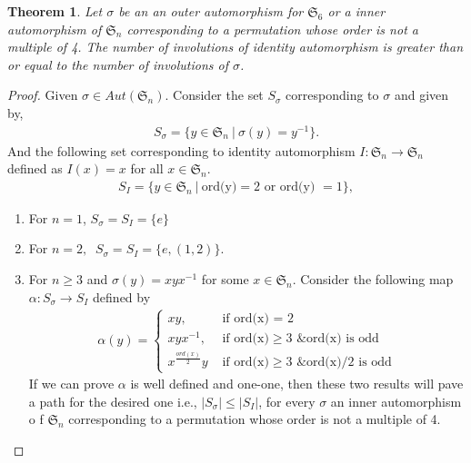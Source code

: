 \documentclass[oneside]{amsart}
\theoremstyle{plain}
\newtheorem{theorem}{Theorem}[section] %
\theoremstyle{definition}
\theoremstyle{remark}
\begin{document}
    \begin{theorem}\label{identity_greater_other}
        Let $\sigma$ be an an outer automorphism for $\mathfrak{S}_6$ or a inner automorphism of $\mathfrak{S}_n$ corresponding to a permutation whose order is not a multiple of 4. The number of involutions of identity automorphism is greater than or equal to the number of involutions of $\sigma$.
    \end{theorem}
    \begin{proof}
        Given $\sigma \in Aut(\mathfrak{S}_n)$. Consider the set $S_{\sigma}$ corresponding to $\sigma$ and given by,
        \begin{align*}
            S_{\sigma} =\{ y \in \mathfrak{S}_n \ | \ \sigma(y) = y^{-1}\}.
        \end{align*}
        And the following set corresponding to identity automorphism $I : \mathfrak{S}_n \rightarrow \mathfrak{S}_n$ defined as $I(x) = x $ for all $x \in \mathfrak{S}_n$.
        \begin{align*}
            S_I = \{y \in \mathfrak{S}_n \ | \ \text{ord(y)} = 2  \text{ or } \text{ord(y) } = 1\},
        \end{align*}
        \begin{enumerate}
            \item For $n = 1$, $S_{\sigma} = S_I = \{e\}$
            \item For $n = 2,\ $ $S_{\sigma} = S_I = \{e, (1,2)\}$. 
            \item For $n \geq 3$ and $\sigma(y) = xyx^{-1}$ for some $x \in \mathfrak{S}_n$. Consider the following map $\alpha: S_\sigma\rightarrow S_I$ defined by
            \begin{align*}
                \alpha(y) = 
                    \begin{cases}
                        xy, & \text{ if ord(x) = 2}\\
                        xyx^{-1}, & \text{ if ord(x)} \geq 3 \text{ \& ord(x) is odd}\\
                        x^{\text{$\frac{ord(x)}{2}$}}y & \text{ if ord(x)} \geq 3 \text{ \& ord(x)/2 is odd}
                    \end{cases}
            \end{align*}
            If we can prove $\alpha$ is well defined and one-one, then these two results will pave a path for the desired one i.e., $|S_{\sigma}| \leq |S_I|$, for every $\sigma$ an inner automorphism o f $\mathfrak{S}_n$ corresponding to a permutation whose order is not a multiple of 4.

\end{enumerate}
\end{proof}
\end{document}
